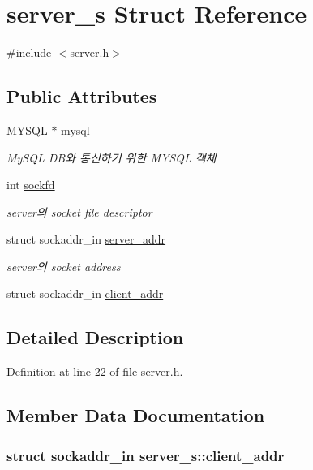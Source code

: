 \hypertarget{structserver__s}{\section{server\-\_\-s Struct Reference}
\label{structserver__s}
}


{\ttfamily \#include $<$server.\-h$>$}

\subsection*{Public Attributes}
\begin{DoxyCompactItemize}
\item 
M\-Y\-S\-Q\-L $\ast$ \hyperlink{structserver__s_aa7cf2b203a27204e2229a5d0f47e7450}{mysql}
\begin{DoxyCompactList}\small\item\em My\-S\-Q\-L D\-B와 통신하기 위한 M\-Y\-S\-Q\-L 객체 \end{DoxyCompactList}\item 
int \hyperlink{structserver__s_a7109ed4db0376f7de840d82c4379099d}{sockfd}
\begin{DoxyCompactList}\small\item\em server의 socket file descriptor \end{DoxyCompactList}\item 
struct sockaddr\-\_\-in \hyperlink{structserver__s_aa49ed3594b99b1da4de179995dfa553d}{server\-\_\-addr}
\begin{DoxyCompactList}\small\item\em server의 socket address \end{DoxyCompactList}\item 
struct sockaddr\-\_\-in \hyperlink{structserver__s_a542d49f8aee930024091c320530d8dbf}{client\-\_\-addr}
\end{DoxyCompactItemize}


\subsection{Detailed Description}


Definition at line 22 of file server.\-h.



\subsection{Member Data Documentation}
\hypertarget{structserver__s_a542d49f8aee930024091c320530d8dbf}{
\subsubsection[{client\-\_\-addr}]{\setlength{\rightskip}{0pt plus 5cm}struct sockaddr\-\_\-in server\-\_\-s\-::client\-\_\-addr}}\label{structserver__s_a542d49f8aee930024091c320530d8dbf}


